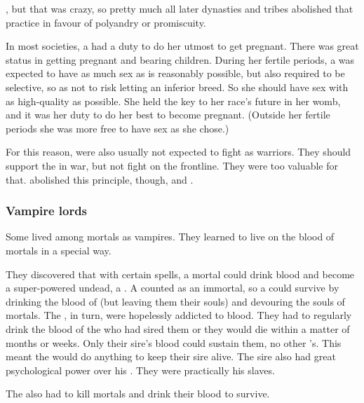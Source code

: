 \Merkyrah{} , but that was crazy, so pretty much all later \resphan{} dynasties and tribes abolished that practice in favour of polyandry or promiscuity.

In most \resphan{} societies, a \resvil{} had a duty to do her utmost to get pregnant. 
There was great status in getting pregnant and bearing children. 
During her fertile periods, a \resvil{} was expected to have as much sex as is reasonably possible, but also required to be selective, so as not to risk letting an inferior \resphan{} breed. 
So she should have sex with as high-quality \resphain{} as possible. 
She held the key to her race's future in her womb, and it was her duty to do her best to become pregnant. 
(Outside her fertile periods she was more free to have sex as she chose.)

For this reason, \resviel{} were also usually not expected to fight as warriors. 
They should support the \resphain{} in war, but not fight on the frontline. 
They were too valuable for that. 
\Mystraacht{} abolished this principle, though, and . 





\subsubsection{Vampire lords}
Some \ashenblood \resphain lived among mortals as vampires. 
They learned to live on the blood of mortals in a special way. 

They discovered that with certain spells, a mortal could drink \resphan blood and become a super-powered undead, a \quo{\reaver}. 
A \reaver {} counted as an immortal, so a \bezed \resphan could survive by drinking the blood of \reavers (but leaving them their souls) and devouring the souls of mortals. 
The \reavers, in turn, were hopelessly addicted to \resphan blood. 
They had to regularly drink the blood of the \resphan who had sired them or they would die within a matter of months or weeks. 
Only their sire's blood could sustain them, no other \resphan's. 
This meant the \reavers would do anything to keep their sire alive. 
The sire also had great psychological power over his \reavers. 
They were practically his slaves. 

The \reavers also had to kill mortals and drink their blood to survive. 

